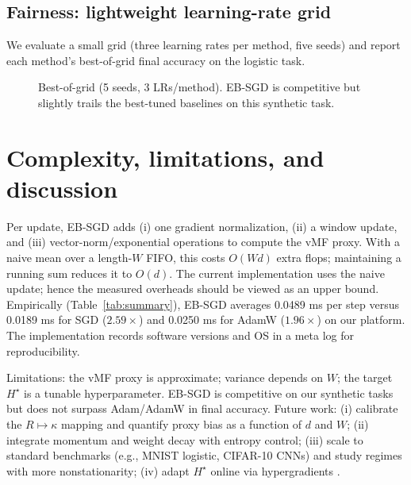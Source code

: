 \subsection{Fairness: lightweight learning-rate grid}
We evaluate a small grid (three learning rates per method, five seeds) and report each method's best-of-grid final accuracy on the logistic task.
\begin{figure}[H]
\centering
\begin{adjustbox}{width=\linewidth}
\end{adjustbox}
\caption{Best-of-grid (5 seeds, 3 LRs/method). EB-SGD is competitive but slightly trails the best-tuned baselines on this synthetic task.}
\label{fig:grid}
\end{figure}

\section{Complexity, limitations, and discussion}
Per update, EB-SGD adds (i) one gradient normalization, (ii) a window update, and (iii) vector-norm/exponential operations to compute the vMF proxy. With a naive mean over a length-$W$ FIFO, this costs $O(Wd)$ extra flops; maintaining a running sum reduces it to $O(d)$. The current implementation uses the naive update; hence the measured overheads should be viewed as an upper bound. Empirically (Table~\ref{tab:summary}), EB-SGD averages 0.0489 ms per step versus 0.0189 ms for SGD ($2.59\times$) and 0.0250 ms for AdamW ($1.96\times$) on our platform. The implementation records software versions and OS in a meta log for reproducibility.

Limitations: the vMF proxy is approximate; variance depends on $W$; the target $H^\star$ is a tunable hyperparameter. EB-SGD is competitive on our synthetic tasks but does not surpass Adam/AdamW in final accuracy. Future work: (i) calibrate the $R\mapsto\kappa$ mapping and quantify proxy bias as a function of $d$ and $W$; (ii) integrate momentum and weight decay with entropy control; (iii) scale to standard benchmarks (e.g., MNIST logistic, CIFAR-10 CNNs) and study regimes with more nonstationarity; (iv) adapt $H^\star$ online via hypergradients \cite{Baydin2018HypergradientICLR}.

